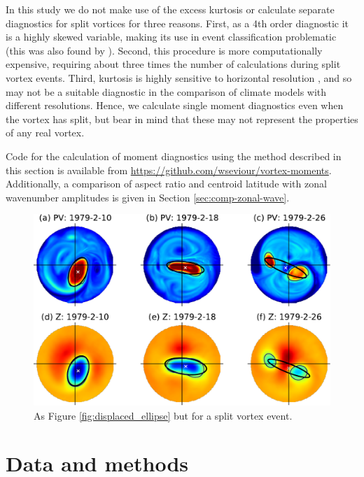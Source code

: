 In this study we do not make use of the excess kurtosis or calculate separate
diagnostics for split vortices for three reasons. First, as a 4th order
diagnostic it is a highly skewed variable, making its use in event
classification problematic (this was also found by
\citet{Hannachi2010}). Second, this procedure is more computationally expensive,
requiring about three times the number of calculations during split vortex
events. Third, kurtosis is highly sensitive to horizontal resolution
\citep{Mitchell2011}, and so may not be a suitable diagnostic in the comparison
of climate models with different resolutions. Hence, we calculate single moment
diagnostics even when the vortex has split, but bear in mind that these may not
represent the properties of any real vortex.

Code for the calculation of moment diagnostics using the method described in
this section is available from
\url{https://github.com/wseviour/vortex-moments}. Additionally, a comparison of
aspect ratio and centroid latitude with zonal wavenumber amplitudes is given in
Section \ref{sec:comp-zonal-wave}.

\begin{figure}
 \centering
 \noindent\includegraphics[width=\textwidth]{figures/chapter-moments/PV_GPH_1979.pdf}
 \caption[Equivalent ellipse for a spit vortex event.]{As Figure
   \ref{fig:displaced_ellipse} but for a split vortex event.}
 \label{fig:split_ellipse}
\end{figure}


\section{Data and methods}
\label{sec:methodology}

